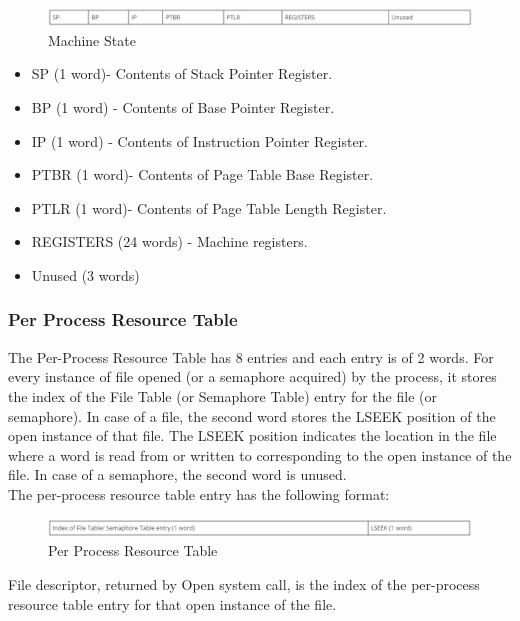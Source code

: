 \begin{figure}[ht]
\centering
\includegraphics  [scale=0.55]{figures/ms.png}
\caption{\footnotesize Machine State}
\end{figure}

\begin {itemize}

\item SP (1 word)- Contents of Stack Pointer Register.
\item BP (1 word) - Contents of Base Pointer Register.
\item IP (1 word) - Contents of Instruction Pointer Register.
\item PTBR (1 word)- Contents of Page Table Base Register.
\item PTLR (1 word)- Contents of Page Table Length Register.
\item REGISTERS (24 words) - Machine registers.
\item Unused (3 words)

\end {itemize}

\subsubsection {Per Process Resource Table}

The Per-Process Resource Table has 8 entries and each entry is of 2 words. For every instance of file opened (or a semaphore acquired) by the process, it stores the index of the File Table (or Semaphore Table) entry for the file (or semaphore). In case of a file, the second word stores the LSEEK position of the open instance of that file. The LSEEK position indicates the location in the file where a word is read from or written to corresponding to the open instance of the file. In case of a semaphore, the second word is unused.
\\
The per-process resource table entry has the following format:
\begin{figure}[ht]
\centering
\includegraphics  [scale=0.55]{figures/prt.png}
\caption{\footnotesize Per Process Resource Table}
\end{figure}

File descriptor, returned by Open system call, is the index of the per-process resource table entry for that open instance of the file.
